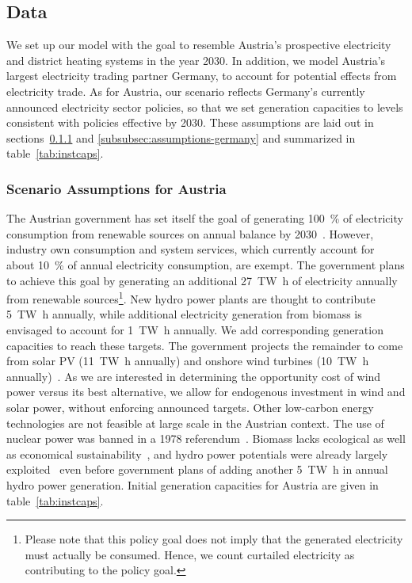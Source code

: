 \documentclass[review, 3p, times]{elsarticle} %
\begin{document}

    \subsection{Data}\label{subsec:data}
    We set up our model with the goal to resemble Austria's prospective electricity and district heating systems in the
    year 2030.
    In addition, we model Austria's largest electricity trading partner Germany, to account for potential effects from
    electricity trade.
    As for Austria, our scenario reflects Germany's currently announced electricity sector policies, so that we set
    generation capacities to levels consistent with policies effective by 2030.
    These assumptions are laid out in sections~\ref{subsubsec:assumptions-austria} and \ref{subsubsec:assumptions-germany}
    and summarized in table~\ref{tab:instcaps}.

    \subsubsection{Scenario Assumptions for Austria}\label{subsubsec:assumptions-austria}
    The Austrian government has set itself the goal of generating \SI{100}{\percent} of electricity consumption from
    renewable sources on annual balance by 2030~\citep{Regierungsprogramm2020}.
    However, industry own consumption and system services, which currently account for about \SI{10}{\percent} of annual
    electricity consumption, are exempt.
    The government plans to achieve this goal by generating an additional \SI{27}{\tera\watt\hour} of electricity
    annually from renewable sources\footnote{Please note that this policy goal does not imply that the generated
    electricity must actually be consumed. Hence, we count curtailed electricity as contributing to the policy goal.}.
    New hydro power plants are thought to contribute \SI{5}{\tera\watt\hour} annually, while additional electricity
    generation from biomass is envisaged to account for \SI{1}{\tera\watt\hour} annually.
    We add corresponding generation capacities to reach these targets.
    The government projects the remainder to come from solar PV (\SI{11}{\tera\watt\hour} annually) and onshore wind
    turbines (\SI{10}{\tera\watt\hour} annually)~\cite{Regierungsprogramm2020}.
    As we are interested in determining the opportunity cost of wind power versus its best alternative, we allow for
    endogenous investment in wind and solar power, without enforcing announced targets.
    Other low-carbon energy technologies are not feasible at large scale in the Austrian context.
    The use of nuclear power was banned in a 1978 referendum~\citep{Pelinka1983}.
    Biomass lacks ecological as well as economical sustainability~\citep{Erb2018}, and hydro power potentials were
    already largely exploited~\citep{Walder2014} even before government plans of adding another \SI{5}{\tera\watt\hour}
    in annual hydro power generation.
    Initial generation capacities for Austria are given in table~\ref{tab:instcaps}.
\end{document}
